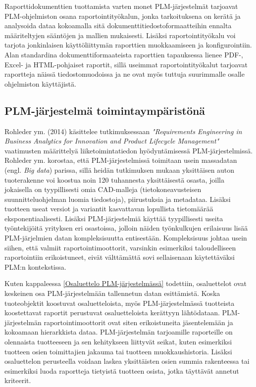 Raporttidokumenttien tuottamista varten monet PLM-järjestelmät tarjoavat PLM-ohjelmiston osana raportointityökalun, jonka tarkoituksena on kerätä ja analysoida dataa kokoamalla sitä dokumenttitiedostoformaatteihin ennalta määriteltyjen sääntöjen ja mallien mukaisesti. Lisäksi raportointityökalu voi tarjota jonkinlaisen käyttöliittymän raporttien muokkaamiseen ja konfigurointiin. Alan standardina dokumenttiformaateista raporttien tapauksessa lienee PDF-, Excel- ja HTML-pohjaiset raportit, sillä useimmat raportointityökalut tarjoavat raportteja näissä tiedostomuodoissa ja ne ovat myös tuttuja suurimmalle osalle ohjelmiston käyttäjistä. 

\subsection{PLM-järjestelmä toimintaympäristönä} \label{PLM-järjestelmä toimintaympäristönä}

Rohleder ym. (2014) käsittelee tutkimuksessaan \textit{"Requirements Engineering in Business Analytics for Innovation and Product Lifecycle Management"} vaatimusten määrittelyä liiketoimintatiedon hyödyntämisessä PLM-järjestelmissä. Rohleder ym. korostaa, että PLM-järjestelmissä toimitaan usein massadatan (engl. \textit{Big data})  parissa, sillä heidän tutkimuksen mukaan yksittäisen auton tuoterakenne voi koostua noin 120 tuhannesta yksittäisestä osasta, joilla jokaisella on tyypillisesti omia CAD-malleja (tietokoneavusteisen suunnitteluohjelman luomia tiedostoja), piirustuksia ja metadataa. Lisäksi tuotteen useat versiot ja variantit kasvattavan lopullista tietomäärää eksponentiaalisesti. Lisäksi PLM-järjestelmiä käyttää tyypillisesti useita työntekijöitä yrityksen eri osastoissa, jolloin näiden työnkulkujen erilaisuus lisää PLM-järjelmien datan kompleksisuutta entisestään. Kompleksisuus johtaa usein siihen, että valmiit raportointimoottorit, varsinkin esimerkiksi taloudelliseen raportointiin erikoistuneet, eivät välttämättä sovi sellaisenaan käytettäväksi PLM:n kontekstissa. \cite{rohleder_requirements_2014}

Kuten kappaleessa \ref{Osaluettelo PLM-järjestelmässä} todettiin, osaluettelot ovat keskeinen osa PLM-järjestelmään tallennetun datan esittämistä. Koska tuoteobjektit koostuvat osaluetteloista, myös PLM-järjestelmässä tuotteista koostettavat raportit perustuvat osaluetteloista kerättyyn lähtödataan. PLM-järjestelmän raportointimoottorit ovat siten erikoistuneita jäsentelemään ja kokoamaan hierarkkista dataa. \cite{rohleder_requirements_2014} PLM-järjestelmän tarjoamille raporteille on olennaista tuotteeseen ja sen kehitykseen liittyvät seikat, kuten esimerkiksi tuotteen osien toimittajien jakauma tai tuotteen muokkaushistoria. Lisäksi osaluettelon perusteella voidaan laskea yksittäisten osien summia rakenteessa tai esimerkiksi luoda raportteja tietyistä tuotteen osista, jotka täyttävät annetut kriteerit.

